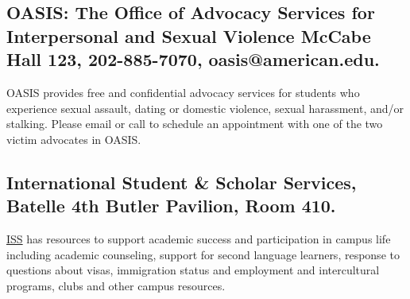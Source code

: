 \documentclass[10pt]{homework}
\begin{document}
\subsection{OASIS: The Office of Advocacy Services for
Interpersonal and Sexual Violence McCabe Hall 123, 202-885-7070,
oasis@american.edu.} OASIS provides free and confidential
advocacy services for students who experience sexual assault,
dating or domestic violence, sexual harassment, and/or stalking.
Please email or call to schedule an appointment with one of the
two victim advocates in OASIS.

\subsection{International Student \& Scholar Services, Batelle
4th Butler Pavilion, Room 410.} \href{https://www.american.edu/ocl/isss/index.cfm}{ISS} has resources to support
academic success and participation in campus life including
academic counseling, support for second language learners,
response to questions about visas, immigration status and
employment and intercultural programs, clubs and other campus
resources.
\end{document}
